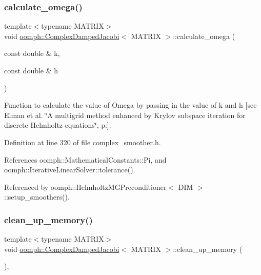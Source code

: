 \subsubsection{\texorpdfstring{calculate\+\_\+omega()}{calculate\_omega()}}
{\footnotesize\ttfamily template$<$typename M\+A\+T\+R\+IX$>$ \\
void \hyperlink{classoomph_1_1ComplexDampedJacobi}{oomph\+::\+Complex\+Damped\+Jacobi}$<$ M\+A\+T\+R\+IX $>$\+::calculate\+\_\+omega (\begin{DoxyParamCaption}\item[{const double \&}]{k,  }\item[{const double \&}]{h }\end{DoxyParamCaption})\hspace{0.3cm}{\ttfamily [inline]}}



Function to calculate the value of Omega by passing in the value of k and h \mbox{[}see Elman et al. \char`\"{}\+A multigrid method enhanced by
\+Krylov subspace iteration for discrete Helmholtz equations\char`\"{}, p.\mbox{]}. 



Definition at line 320 of file complex\+\_\+smoother.\+h.



References oomph\+::\+Mathematical\+Constants\+::\+Pi, and oomph\+::\+Iterative\+Linear\+Solver\+::tolerance().



Referenced by oomph\+::\+Helmholtz\+M\+G\+Preconditioner$<$ D\+I\+M $>$\+::setup\+\_\+smoothers().

\mbox{\label{classoomph_1_1ComplexDampedJacobi_a4e246d712c8eb9e4db05f859148784d3}} 
\subsubsection{\texorpdfstring{clean\+\_\+up\+\_\+memory()}{clean\_up\_memory()}}
{\footnotesize\ttfamily template$<$typename M\+A\+T\+R\+IX$>$ \\
void \hyperlink{classoomph_1_1ComplexDampedJacobi}{oomph\+::\+Complex\+Damped\+Jacobi}$<$ M\+A\+T\+R\+IX $>$\+::clean\+\_\+up\+\_\+memory (\begin{DoxyParamCaption}{ }\end{DoxyParamCaption})\hspace{0.3cm}{\ttfamily [inline]}, {\ttfamily [virtual]}}



